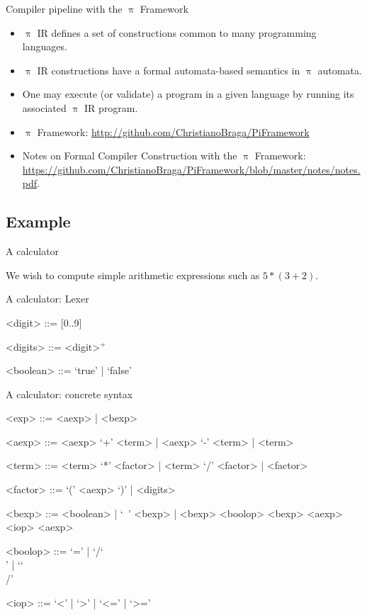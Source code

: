 \documentclass{beamer}
\newcommand{\BS}{\char`\\}
\begin{document}
\begin{frame}[shrink]{Compiler pipeline with the {\color{red}$\uppi$ Framework}}
\begin{itemize}
\item {\color{red}$\uppi$ IR} defines a set of constructions common to many programming languages.
\item {\color{red}$\uppi$ IR} constructions have a formal automata-based semantics in {\color{red}$\uppi$ automata}.
\item One may execute (or validate) a program in a given language by running its associated {\color{red}$\uppi$ IR} program. 
\item {\color{red}$\uppi$ Framework}: \url{http://github.com/ChristianoBraga/PiFramework}
\item Notes on Formal Compiler Construction with the {\color{red}$\uppi$ Framework}: \url{https://github.com/ChristianoBraga/PiFramework/blob/master/notes/notes.pdf}.
\end{itemize}

\end{frame}

\subsection{Example}

\begin{frame}[fragile]{A calculator}

We wish to compute simple arithmetic expressions such as $ 5 * (3 + 2)$.

\end{frame}


\begin{frame}[fragile]{A calculator: Lexer}
\begin{grammar}
<digit> ::= [0..9]

<digits> ::= <digit>$^+$

<boolean> ::= `true' | `false'
\end{grammar}
\end{frame}


\begin{frame}[fragile]{A calculator: concrete syntax}
\begin{grammar}
<exp> ::= <aexp> | <bexp>

<aexp> ::= <aexp> `+' <term> | <aexp> `-' <term> | <term>

<term> ::= <term> `*' <factor> | <term> `/' <factor> | <factor>

<factor> ::= `(' <aexp> `)'  | <digits>

<bexp> ::= <boolean> | `~' <bexp> | <bexp> <boolop> <bexp> 
\alt <aexp> <iop> <aexp>

<boolop> ::= `=' | `/\BS' | `\BS/'

<iop> ::= `<' | `>' | `<=' | `>=' 
\end{grammar}
\end{frame}
\end{document}
